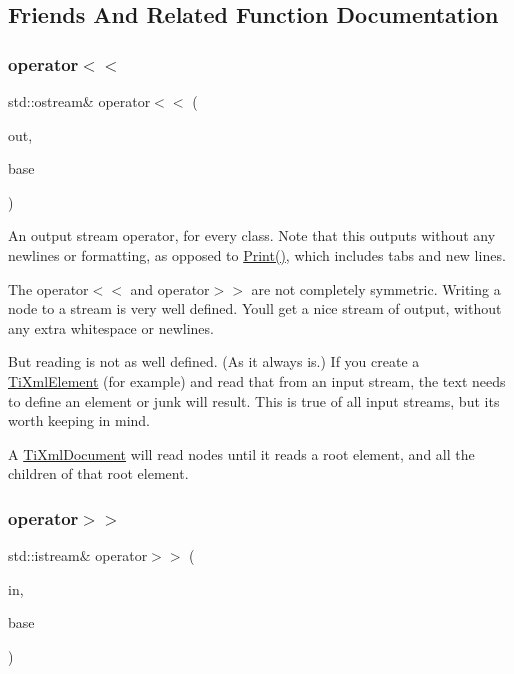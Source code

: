 \subsection{Friends And Related Function Documentation}
\hypertarget{class_ti_xml_node_a86cd49cfb17a844c0010b3136ac966c7}{}\label{class_ti_xml_node_a86cd49cfb17a844c0010b3136ac966c7} 
\subsubsection{\texorpdfstring{operator$<$$<$}{operator<<}}
{\footnotesize\ttfamily std\+::ostream\& operator$<$$<$ (\begin{DoxyParamCaption}\item[{std\+::ostream \&}]{out,  }\item[{const \hyperlink{class_ti_xml_node}{Ti\+Xml\+Node} \&}]{base }\end{DoxyParamCaption})\hspace{0.3cm}{\ttfamily [friend]}}

An output stream operator, for every class. Note that this outputs without any newlines or formatting, as opposed to \hyperlink{class_ti_xml_base_a0de56b3f2ef14c65091a3b916437b512}{Print()}, which includes tabs and new lines.

The operator$<$$<$ and operator$>$$>$ are not completely symmetric. Writing a node to a stream is very well defined. You\textquotesingle{}ll get a nice stream of output, without any extra whitespace or newlines.

But reading is not as well defined. (As it always is.) If you create a \hyperlink{class_ti_xml_element}{Ti\+Xml\+Element} (for example) and read that from an input stream, the text needs to define an element or junk will result. This is true of all input streams, but it\textquotesingle{}s worth keeping in mind.

A \hyperlink{class_ti_xml_document}{Ti\+Xml\+Document} will read nodes until it reads a root element, and all the children of that root element. \hypertarget{class_ti_xml_node_ab57bd426563c926844f65a78412e18b9}{}\label{class_ti_xml_node_ab57bd426563c926844f65a78412e18b9} 
\subsubsection{\texorpdfstring{operator$>$$>$}{operator>>}}
{\footnotesize\ttfamily std\+::istream\& operator$>$$>$ (\begin{DoxyParamCaption}\item[{std\+::istream \&}]{in,  }\item[{\hyperlink{class_ti_xml_node}{Ti\+Xml\+Node} \&}]{base }\end{DoxyParamCaption})\hspace{0.3cm}{\ttfamily [friend]}}

